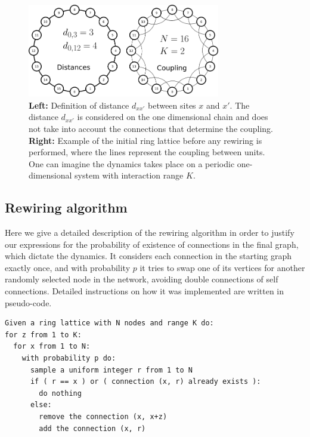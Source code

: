 \begin{figure}
  \centering
  \includegraphics[width=0.75\textwidth]{fig/ring-distance.png}
  \caption{\label{fig:ring-distance}
    \textbf{Left:} Definition of distance $d_{xx'}$ between sites $x$ and $x'$. The distance $d_{xx'}$ is considered on the one
    dimensional chain and does not take into account the connections that determine the coupling.\\
    \textbf{Right:} Example of the initial ring lattice before any rewiring is performed, where the lines represent the coupling
    between units.\\
    One can imagine the dynamics takes place on a periodic one-dimensional system with interaction range $K$.
  }
\end{figure}

\subsection{Rewiring algorithm}

Here we give a detailed description of the rewiring algorithm in order to justify our expressions for the probability of existence of
connections in the final graph, which dictate the dynamics. It considers each connection in the starting graph exactly once, and with
probability $p$ it tries to swap one of its vertices for another randomly selected node in the network, avoiding double connections of
self connections. Detailed instructions on how it was implemented are written in pseudo-code.

\noindent
\begin{minipage}{\linewidth}
\begin{lstlisting}
Given a ring lattice with N nodes and range K do:
for z from 1 to K:
  for x from 1 to N:
    with probability p do:
      sample a uniform integer r from 1 to N
      if ( r == x ) or ( connection (x, r) already exists ):
        do nothing
      else:
        remove the connection (x, x+z)
        add the connection (x, r)
\end{lstlisting}
\end{minipage}

